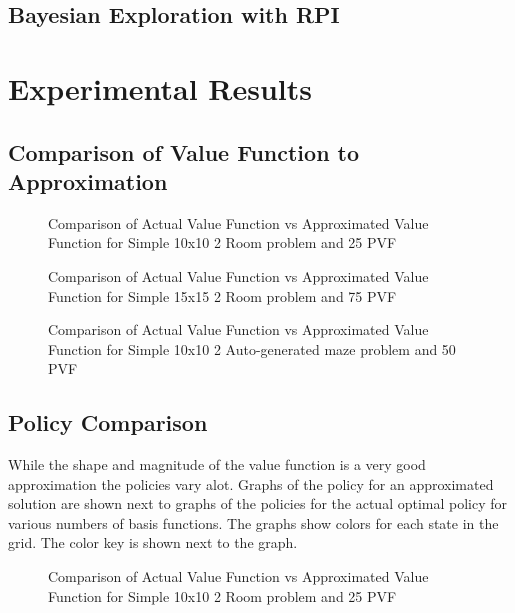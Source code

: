 \documentclass[12pt, letterpaper, final]{report}
\begin{document}
\subsection*{Bayesian Exploration with RPI}

\section{Experimental Results}

\subsection*{Comparison of Value Function to Approximation}

\FloatBarrier
\begin{figure}[h!]
\centering
\caption{Comparison of Actual Value Function vs Approximated Value
  Function for Simple 10x10 2 Room problem and 25 PVF}
\label{valueVsQ1}
\end{figure}
\FloatBarrier

\FloatBarrier
\begin{figure}[h!]
\centering
\caption{Comparison of Actual Value Function vs Approximated Value
  Function for Simple 15x15 2 Room problem and 75 PVF}
\label{valueVsQ2}
\end{figure}
\FloatBarrier

\FloatBarrier
\begin{figure}[h!]
\centering
\caption{Comparison of Actual Value Function vs Approximated Value
  Function for Simple 10x10 2 Auto-generated maze problem and 50 PVF}
\label{valueVsQ3}
\end{figure}
\FloatBarrier

\subsection*{Policy Comparison}

While the shape and magnitude of the value function is a very good
approximation the policies vary alot. Graphs of the policy for an
approximated solution are shown next to graphs of the policies for the
actual optimal policy for various numbers of basis functions. The graphs show colors for each state in the
grid. The color key is shown next to the graph.

\FloatBarrier
\begin{figure}[h!]
\centering
\caption{Comparison of Actual Value Function vs Approximated Value
  Function for Simple 10x10 2 Room problem and 25 PVF}
\label{valueVsQ1}
\end{figure}
\FloatBarrier
\end{document}

